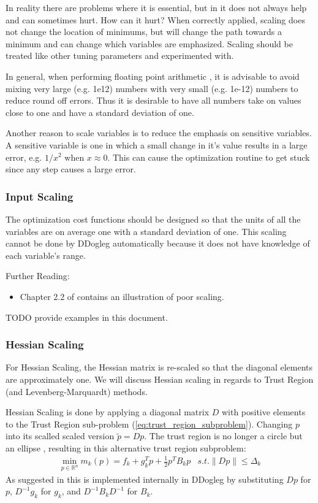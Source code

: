 \documentclass[peerreview,compsoc,onecolumn]{IEEEtran}
\newcommand{\R}{\mathbb{R}}
\newcommand{\norm}[1]{\left\lVert#1\right\rVert}
\begin{document}
In reality there are problems where it is essential, but in it does not always help and can sometimes hurt. How can it hurt? When correctly applied, scaling does not change the location of minimums, but will change the path towards a minimum \cite{dennis1996} and can change which variables are emphasized. Scaling should be treated like other tuning parameters and experimented with.

In general, when performing floating point arithmetic \cite{goldberg1991every}, it is advisable to avoid mixing very large (e.g. 1e12) numbers with very small (e.g. 1e-12) numbers to reduce round off errors. Thus it is desirable to have all numbers take on values close to one and have a standard deviation of one.

Another reason to scale variables is to reduce the emphasis on sensitive variables. A sensitive variable is one in which a small change in it's value results in a large error, e.g. $1/x^2$ when $x \approx 0$. This can cause the optimization routine to get stuck since any step causes a large error.

\subsubsection{Input Scaling}

The optimization cost functions should be designed so that the units of all the variables are on average one with a standard deviation of one. This scaling cannot be done by DDogleg automatically because it does not have knowledge of each variable's range.

Further Reading:
\begin{itemize}
\item Chapter 2.2 of \cite{numopt2006} contains an illustration of poor scaling.
\end{itemize}

TODO provide examples in this document.

\subsubsection{Hessian Scaling}

For Hessian Scaling, the Hessian matrix is re-scaled so that the diagonal elements are approximately one. We will discuss Hessian scaling in regards to Trust Region (and Levenberg-Marquardt) methods.

Hessian Scaling is done by applying a diagonal matrix $D$ with positive elements to the Trust Region sub-problem (\ref{eq:trust_region_subproblem}). Changing $p$ into its scalled scaled version $\tilde{p} = Dp$. The trust region is no longer a circle but an ellipse \cite{numopt2006}, resulting in this alternative trust region subproblem:
\begin{equation}
\begin{array}{lr}
\min\limits_{p\in \R^n} m_k(p) = f_k + g^T_k p + \frac{1}{2}p^T B_k p & s.t. \norm{Dp} \le \Delta_k
\end{array}
\end{equation}
As suggested in \cite{numopt2006} this is implemented internally in DDogleg by substituting $Dp$ for $p$, $D^{-1}g_k$ for $g_k$, and $D^{-1}B_k D^{-1}$ for $B_k$.  
\end{document}
